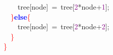 \mbox{}\ \ \ \ tree\textcolor{BrickRed}{[}node\textcolor{BrickRed}{]}\ \textcolor{BrickRed}{=}\ tree\textcolor{BrickRed}{[}\textcolor{Purple}{2}\textcolor{BrickRed}{*}node\textcolor{BrickRed}{+}\textcolor{Purple}{1}\textcolor{BrickRed}{];} \\
\mbox{}\ \ \textcolor{Red}{\}}\textbf{\textcolor{Blue}{else}}\textcolor{Red}{\{} \\
\mbox{}\ \ \ \ tree\textcolor{BrickRed}{[}node\textcolor{BrickRed}{]}\ \textcolor{BrickRed}{=}\ tree\textcolor{BrickRed}{[}\textcolor{Purple}{2}\textcolor{BrickRed}{*}node\textcolor{BrickRed}{+}\textcolor{Purple}{2}\textcolor{BrickRed}{];} \\
\mbox{}\ \ \textcolor{Red}{\}} \\
\mbox{}\textcolor{Red}{\}} \\
\mbox{}
